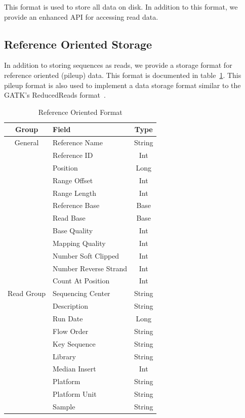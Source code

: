 \documentclass[10pt,twocolumn]{article}
\begin{document}
This format is used to store all data on disk. In addition to this format, we provide an enhanced API for accessing read
data.

\subsection{Reference Oriented Storage}
\label{sec:reference-oriented-storage}

In addition to storing sequences as reads, we provide a storage format for reference oriented (pileup) data. This format
is documented in table~\ref{tab:reference-oriented-format}. This pileup format is also used to implement a data storage
format similar to the GATK's ReducedReads format~\cite{depristo11}.

\begin{table}[h]
\caption{Reference Oriented Format}
\label{tab:reference-oriented-format}
\begin{center}
\begin{tabular}{| c | l | c |}
\hline
\bf Group & \bf Field & \bf Type \\
\hline
General & Reference Name & String \\
 & Reference ID & Int \\
 & Position & Long \\
 & Range Offset & Int \\
 & Range Length & Int \\
 & Reference Base & Base \\
 & Read Base & Base \\
 & Base Quality & Int \\
 & Mapping Quality & Int \\
 & Number Soft Clipped & Int \\
 & Number Reverse Strand & Int \\
 & Count At Position & Int \\
\hline
Read Group & Sequencing Center & String \\
 & Description & String \\
 & Run Date & Long \\
 & Flow Order & String \\
 & Key Sequence & String \\
 & Library & String \\
 & Median Insert & Int \\
 & Platform & String \\
 & Platform Unit & String \\
 & Sample & String \\
\hline
\end{tabular}
\end{center}
\end{table}
\end{document}
